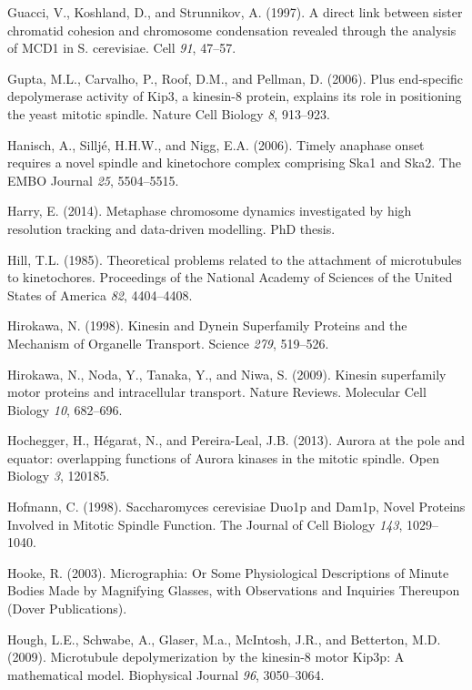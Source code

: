 \documentclass[12pt,a4paper,twoside,openright]{book}
\begin{document}
\hypertarget{ref-Guacci1997}{}
Guacci, V., Koshland, D., and Strunnikov, A. (1997). A direct link
between sister chromatid cohesion and chromosome condensation revealed
through the analysis of MCD1 in S. cerevisiae. Cell \emph{91}, 47--57.

\hypertarget{ref-Gupta2006}{}
Gupta, M.L., Carvalho, P., Roof, D.M., and Pellman, D. (2006). Plus
end-specific depolymerase activity of Kip3, a kinesin-8 protein,
explains its role in positioning the yeast mitotic spindle. Nature Cell
Biology \emph{8}, 913--923.

\hypertarget{ref-Hanisch2006}{}
Hanisch, A., Silljé, H.H.W., and Nigg, E.A. (2006). Timely anaphase
onset requires a novel spindle and kinetochore complex comprising Ska1
and Ska2. The EMBO Journal \emph{25}, 5504--5515.

\hypertarget{ref-Harry2014}{}
Harry, E. (2014). Metaphase chromosome dynamics investigated by high
resolution tracking and data-driven modelling. PhD thesis.

\hypertarget{ref-Hill1985}{}
Hill, T.L. (1985). Theoretical problems related to the attachment of
microtubules to kinetochores. Proceedings of the National Academy of
Sciences of the United States of America \emph{82}, 4404--4408.

\hypertarget{ref-Hirokawa1998}{}
Hirokawa, N. (1998). Kinesin and Dynein Superfamily Proteins and the
Mechanism of Organelle Transport. Science \emph{279}, 519--526.

\hypertarget{ref-Hirokawa2009}{}
Hirokawa, N., Noda, Y., Tanaka, Y., and Niwa, S. (2009). Kinesin
superfamily motor proteins and intracellular transport. Nature Reviews.
Molecular Cell Biology \emph{10}, 682--696.

\hypertarget{ref-Hochegger2013}{}
Hochegger, H., Hégarat, N., and Pereira-Leal, J.B. (2013). Aurora at the
pole and equator: overlapping functions of Aurora kinases in the mitotic
spindle. Open Biology \emph{3}, 120185.

\hypertarget{ref-Hofmann1998}{}
Hofmann, C. (1998). Saccharomyces cerevisiae Duo1p and Dam1p, Novel
Proteins Involved in Mitotic Spindle Function. The Journal of Cell
Biology \emph{143}, 1029--1040.

\hypertarget{ref-hooke2003micrographia}{}
Hooke, R. (2003). Micrographia: Or Some Physiological Descriptions of
Minute Bodies Made by Magnifying Glasses, with Observations and
Inquiries Thereupon (Dover Publications).

\hypertarget{ref-Hough2009}{}
Hough, L.E., Schwabe, A., Glaser, M.a., McIntosh, J.R., and Betterton,
M.D. (2009). Microtubule depolymerization by the kinesin-8 motor Kip3p:
A mathematical model. Biophysical Journal \emph{96}, 3050--3064.
\end{document}
